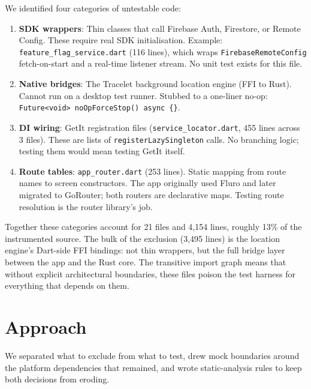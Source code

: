 \documentclass[10pt,journal,compsoc]{IEEEtran}
\begin{document}
We identified four categories of untestable code:

\begin{enumerate}
  \item \textbf{SDK wrappers}: Thin classes that call Firebase Auth,
        Firestore, or Remote Config. These require real SDK initialisation.
        Example: \texttt{feature\_flag\_service.dart} (116 lines), which
        wraps \texttt{FirebaseRemoteConfig} fetch-on-start and a
        real-time listener stream. No unit test exists for this file.
  \item \textbf{Native bridges}: The Tracelet background location engine
        (FFI to Rust). Cannot run on a desktop test runner. Stubbed to a
        one-liner no-op: \texttt{Future<void> noOpForceStop() async \{\}}.
  \item \textbf{DI wiring}: GetIt registration files
        (\texttt{service\_locator.dart}, 455 lines across 3 files). These
        are lists of \texttt{registerLazySingleton} calls. No branching
        logic; testing them would mean testing GetIt itself.
  \item \textbf{Route tables}: \texttt{app\_router.dart} (253 lines).
        Static mapping from route names to screen constructors. The app
        originally used Fluro and later migrated to GoRouter; both
        routers are declarative maps. Testing route resolution is the
        router library's job.
\end{enumerate}

Together these categories account for 21 files and 4,154 lines, roughly
13\% of the instrumented source. The bulk of the exclusion (3,495 lines)
is the location engine's Dart-side FFI bindings: not thin wrappers, but
the full bridge layer between the app and the Rust core. The transitive
import graph means that without explicit architectural boundaries, these
files poison the test harness for everything that depends on them.


\section{Approach}
\label{sec:approach}

We separated what to exclude from what to test, drew mock boundaries
around the platform dependencies that remained, and wrote static-analysis
rules to keep both decisions from eroding.
\end{document}
